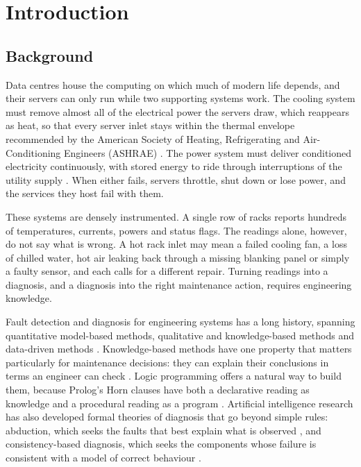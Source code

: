\chapter{Introduction}
\label{ch:introduction}

\section{Background}
\label{sec:background}

Data centres house the computing on which much of modern life depends, and their servers can only run while two supporting systems work. The cooling system must remove almost all of the electrical power the servers draw, which reappears as heat, so that every server inlet stays within the thermal envelope recommended by the American Society of Heating, Refrigerating and Air-Conditioning Engineers (ASHRAE) \parencite{ashrae2021}. The power system must deliver conditioned electricity continuously, with stored energy to ride through interruptions of the utility supply \parencite{barroso2018}. When either fails, servers throttle, shut down or lose power, and the services they host fail with them.

These systems are densely instrumented. A single row of racks reports hundreds of temperatures, currents, powers and status flags. The readings alone, however, do not say what is wrong. A hot rack inlet may mean a failed cooling fan, a loss of chilled water, hot air leaking back through a missing blanking panel or simply a faulty sensor, and each calls for a different repair. Turning readings into a diagnosis, and a diagnosis into the right maintenance action, requires engineering knowledge.

Fault detection and diagnosis for engineering systems has a long history, spanning quantitative model-based methods, qualitative and knowledge-based methods and data-driven methods \parencite{venkat2003,isermann2006}. Knowledge-based methods have one property that matters particularly for maintenance decisions: they can explain their conclusions in terms an engineer can check \parencite{jackson1998}. Logic programming offers a natural way to build them, because Prolog's Horn clauses have both a declarative reading as knowledge and a procedural reading as a program \parencite{kowalski1979,bratko2012}. Artificial intelligence research has also developed formal theories of diagnosis that go beyond simple rules: abduction, which seeks the faults that best explain what is observed \parencite{poole1989,peng1990}, and consistency-based diagnosis, which seeks the components whose failure is consistent with a model of correct behaviour \parencite{reiter1987,dekleer1987}.

